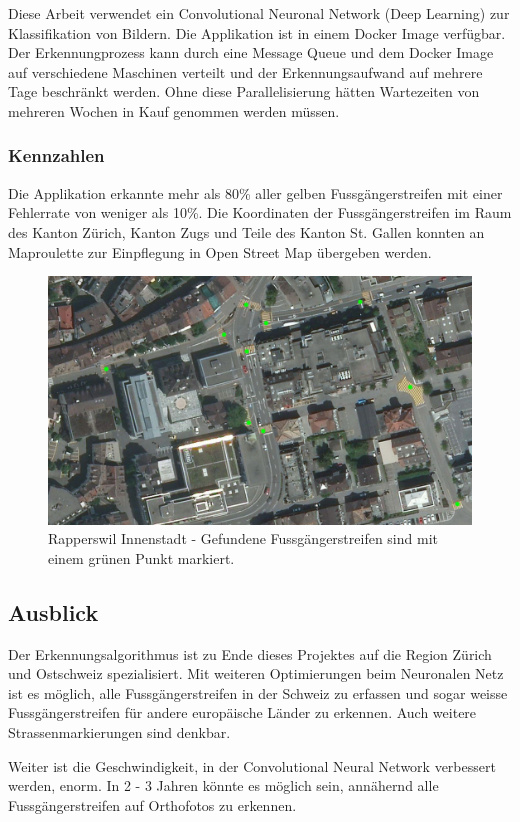 Diese Arbeit verwendet ein Convolutional Neuronal Network (Deep Learning) zur Klassifikation von Bildern. Die Applikation ist in einem Docker Image verfügbar. Der Erkennungprozess kann durch eine Message Queue und dem Docker Image auf verschiedene Maschinen verteilt und der Erkennungsaufwand auf mehrere Tage beschränkt werden. Ohne diese Parallelisierung hätten Wartezeiten von mehreren Wochen in Kauf genommen werden müssen.

\subsubsection{Kennzahlen}
Die Applikation erkannte mehr als 80\% aller gelben Fussgängerstreifen mit einer Fehlerrate von weniger als 10\%. Die Koordinaten der Fussgängerstreifen im Raum des Kanton Zürich, Kanton Zugs und Teile des Kanton St. Gallen konnten an Maproulette zur Einpflegung in Open Street Map übergeben werden.
\\
\begin{figure}[H]
	\centering
	\includegraphics[width=\textwidth -10mm]{images/boxsave_rappi.png}
	\caption[Überblick]{Rapperswil Innenstadt - Gefundene Fussgängerstreifen sind mit einem grünen Punkt markiert.}
\end{figure}

\subsection*{Ausblick}
Der Erkennungsalgorithmus ist zu Ende dieses Projektes auf die Region Zürich und Ostschweiz spezialisiert. Mit weiteren Optimierungen beim Neuronalen Netz ist es möglich, alle Fussgängerstreifen in der Schweiz zu erfassen und sogar weisse Fussgängerstreifen für andere europäische Länder zu erkennen. Auch weitere Strassenmarkierungen sind denkbar.

Weiter ist die Geschwindigkeit, in der Convolutional Neural Network verbessert werden, enorm. In 2 - 3 Jahren könnte es möglich sein, annähernd alle Fussgängerstreifen auf Orthofotos zu erkennen.
\newpage